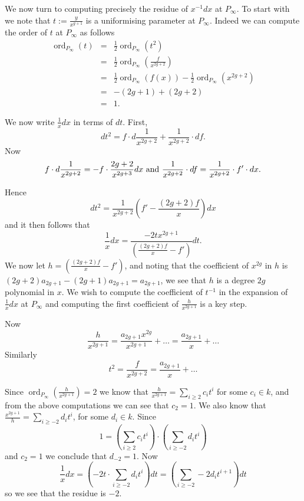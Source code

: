 \documentclass[draft, 11pt]{article} %
\theoremstyle{plain}
\theoremstyle{remark}
\DeclareMathOperator{\ord}{ord}
\begin{document}
We now turn to computing precisely the residue of $x^{-1}dx$ at $P_\infty$.
To start with we note that $t:= \frac{y}{x^{g+1}}$ is a uniformising parameter at $P_\infty$.
Indeed we can compute the order of $t$ at $P_\infty$ as follows 
\begin{eqnarray}
	\ord_{P_\infty}(t) & = & \frac{1}{2}\ord_{P_\infty}(t^2) \\
 	& = & \frac{1}{2}\ord_{P_\infty}\left( \frac{f}{x^{2g+2}} \right) \\
	& = & \frac{1}{2}\ord_{P_\infty}(f(x)) - \frac{1}{2}\ord_{P_\infty}(x^{2g+2})\\
	& = & -(2g+1) + (2g+2) \\
	& = & 1.
\end{eqnarray}

We now write $\frac{1}{x}dx$ in terms of $dt$.
First, 
\[
dt^2 = f\cdot d\frac{1}{x^{2g+2}} + \frac{1}{x^{2g+2}} \cdot df.
\]
Now 
\[
f\cdot d\frac{1}{x^{2g+2}} = -f\cdot \frac{2g+2}{x^{2g+3}} dx \ {\rm and}\ \frac{1}{x^{2g+2}} \cdot df = \frac{1}{x^{2g+2}}\cdot f' \cdot dx.
\]

Hence
\[
dt^2 = \frac{1}{x^{2g+2}}\left(f' - \frac{(2g+2)f}{x}\right) dx
\]
and it then follows that
\[
\frac{1}{x}dx = \frac{-2tx^{2g+1}}{\left(\frac{(2g+2)f}{x} - f'\right)} dt.
\]
We now let $h = \left(\frac{(2g+2)f}{x} - f'\right)$, and noting that the coefficient of $x^{2g}$ in $h$ is $(2g+2)a_{2g+1} - (2g+1)a_{2g+1} = a_{2g+1}$, we see that $h$ is a degree $2g$ polynomial in $x$.
We wish to compute the coefficient of $t^{-1}$ in the expansion of $\frac{1}{x}dx$ at $P_\infty$ and computing the first coefficient of $\frac{h}{x^{2g+1}}$ is a key step.

Now
\[
\frac{h}{x^{2g+1}} = \frac{a_{2g+1}x^{2g}}{x^{2g+1}} + \ldots = \frac{a_{2g+1}}{x} + \ldots 
\]
Similarly 
\[
t^2 = \frac{f}{x^{2g+2} } = \frac{a_{2g+1}}{x} + \ldots
\]

Since $\ord_{P_\infty}\left(\frac{h}{x^{2g+1}}\right) = 2$ we know that $\frac{h}{x^{2g+1}} = \sum_{i\geq 2} c_it^i$ for some $c_i\in k$, and from the above computations we can see that $c_2 = 1$.
We also know that $\frac{x^{2g+1}}{h} = \sum_{i\geq -2} d_it^i$, for some $d_i\in k$.
Since
\[
1 = \left( \sum_{i\geq 2} c_it^i\right) \cdot \left( \sum_{i\geq -2} d_it^i\right)
\]
 and $c_2 = 1$ we conclude that $d_{-2} = 1$. 
Now 
\[
\frac{1}{x}dx = \left( -2t \cdot \sum_{i\geq -2} d_it^i\right) dt = \left( \sum_{i\geq -2}-2d_it^{i+1} \right) dt
\]
so we see that the residue is $-2$.
\end{document}
